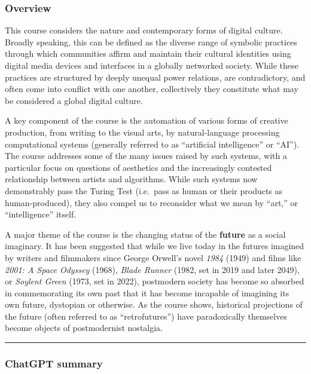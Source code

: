 \documentclass[
  letterpaper,
  DIV=11,
  numbers=noendperiod]{scrartcl}
\begin{document}
\hypertarget{overview}{%
\subsubsection{Overview}\label{overview}}

This course considers the nature and contemporary forms of digital
culture. Broadly speaking, this can be defined as the diverse range of
symbolic practices through which communities affirm and maintain their
cultural identities using digital media devices and interfaces in a
globally networked society. While these practices are structured by
deeply unequal power relations, are contradictory, and often come into
conflict with one another, collectively they constitute what may be
considered a global digital culture.

A key component of the course is the automation of various forms of
creative production, from writing to the visual arts, by
natural-language processing computational systems (generally referred to
as ``artificial intelligence'' or ``AI''). The course addresses some of
the many issues raised by such systems, with a particular focus on
questions of aesthetics and the increasingly contested relationship
between artists and algorithms. While such systems now demonstrably pass
the Turing Test (i.e.~pass as human or their products as
human-produced), they also compel us to reconsider what we mean by
``art,'' or ``intelligence'' itself.

A major theme of the course is the changing status of the
\textbf{future} as a social imaginary. It has been suggested that while
we live today in the futures imagined by writers and filmmakers since
George Orwell's novel \emph{1984} (1949) and films like \emph{2001: A
Space Odyssey} (1968), \emph{Blade Runner} (1982, set in 2019 and later
2049), or \emph{Soylent Green} (1973, set in 2022), postmodern society
has become so absorbed in commemorating its own past that it has become
incapable of imagining its own future, dystopian or otherwise. As the
course shows, historical projections of the future (often referred to as
``retrofutures'') have paradoxically themselves become objects of
postmodernist nostalgia.

\begin{center}\rule{0.5\linewidth}{0.5pt}\end{center}

\hypertarget{chatgpt-summary}{%
\subsubsection{ChatGPT summary}\label{chatgpt-summary}}
\end{document}

